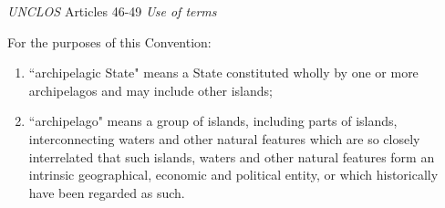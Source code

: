 \begin{conventiondetails}{\textit{UNCLOS} Articles 46-49}
    \flushleft
    \textit{Use of terms}

    \vspace{\baselineskip}

    For the purposes of this Convention:
    \begin{enumerate}[label=(\alph*)]
        \item ``archipelagic State" means a State constituted wholly by one or more archipelagos and may include other islands;
        \item ``archipelago" means a group of islands, including parts of islands, interconnecting waters and other natural features which are so closely interrelated that such islands, waters and other natural features form an intrinsic geographical, economic and political entity, or which historically have been regarded as such.
    \end{enumerate}


\end{conventiondetails}
